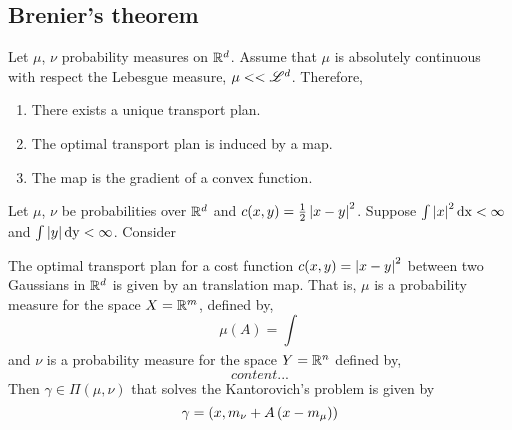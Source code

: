 \subsection{Brenier's theorem}

\begin{theorem}
	Let $\mu$, $\nu$ probability measures on $\mathbb{R}^d$. Assume that $\mu$ is absolutely continuous with respect the Lebesgue measure, $\mu<<\mathscr{L}^d$. Therefore,
	\begin{enumerate}
		\item There exists a unique transport plan.
		\item The optimal transport plan is induced by a map.
		\item The map is the gradient of a convex function. 
	\end{enumerate}
\end{theorem}

\begin{theorem}
	Let $\mu$, $\nu$  be probabilities over $\mathbb{R}^d$ and $c(x,y)=\frac{1}{2}\left| x-y \right|^2$. Suppose $\int \left| x \right|^2 \mathrm{dx} <\infty$ and $\int \left| y \right|\mathrm{dy}<\infty$. Consider
\end{theorem}


\begin{theorem}
	The optimal transport plan for a cost function $c(x,y)=\left| x-y \right|^2$ between two Gaussians in $\mathbb{R}^d$ is given by an translation map.
	That is, $\mu$ is a probability measure for the space $X=\mathbb{R}^m$, defined by,
	\begin{equation*}
	\mu(A)=\int_{}	
	\end{equation*}
	and $\nu$ is a probability measure for the space $Y=\mathbb{R}^n$ defined by,
	\begin{equation*}
		content...
	\end{equation*} 
	Then $\gamma\in \Pi(\mu,\nu)$ that solves the Kantorovich's problem is given by 
	\begin{equation}
		\gamma=\left( x, m_\nu+A\left( x-m_\mu \right) \right)
	\end{equation}
\end{theorem}


